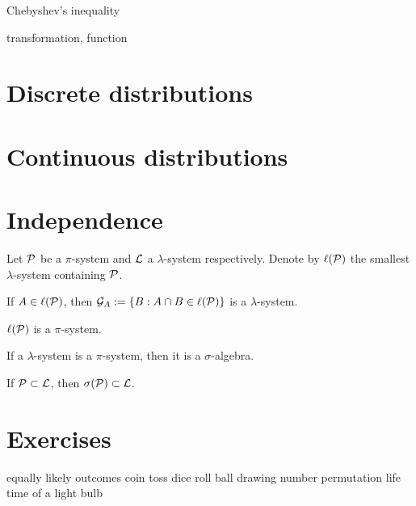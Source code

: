 \documentclass{../note}
\begin{document}
\begin{prb}
Chebyshev's inequality
\end{prb}
\begin{prb}
\end{prb}
\begin{prb}
transformation, function
\end{prb}

\section{Discrete distributions}

\section{Continuous distributions}

\section{Independence}

\begin{prb}
Let $\mathcal{P}$ be a $\pi$-system and $\mathcal{L}$ a $\lambda$-system respectively.
Denote by $\ell(\mathcal{P})$ the smallest $\lambda$-system containing $\mathcal{P}$.
\begin{parts}
\item If $A\in\ell(\mathcal{P})$, then $\mathcal{G}_A:=\{B:A\cap B\in\ell(\mathcal{P})\}$ is a $\lambda$-system.
\item $\ell(\mathcal{P})$ is a $\pi$-system.
\item If a $\lambda$-system is a $\pi$-system, then it is a $\sigma$-algebra.
\item If $\mathcal{P}\subset\mathcal{L}$, then $\sigma(\mathcal{P})\subset\mathcal{L}$.
\end{parts}
\end{prb}

\begin{prb}

\end{prb}





\section*{Exercises}

equally likely outcomes
	coin toss
	dice roll
	ball drawing
	number permutation
	life time of a light bulb
\end{document}
